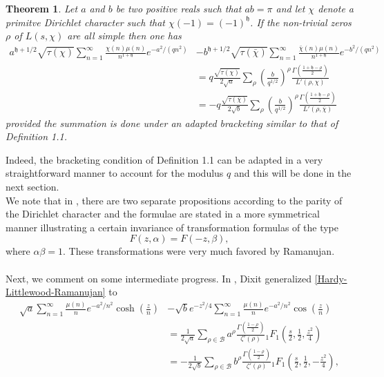 \documentclass[11pt]{article}
\newtheorem{theorem}{Theorem}[section]
\numberwithin{equation}{section}		 			%
\numberwithin{figure}{section}			 			%
\begin{document}
\begin{theorem} \label{dixit}
Let $a$ and $b$ be two positive reals such that $ab = \pi$ and let $\chi$ denote a primitve Dirichlet character such that $\chi(-1)=(-1)^\mathfrak{h}$. If the non-trivial zeros $\rho$ of $L(s,\chi)$ are all simple then one has
\begin{align} \label{dixit_eq_char}
  a^{\mathfrak{h} + 1/2} \sqrt {\tau(\chi )} \sum\limits_{n = 1}^\infty  {\frac{{\chi (n)\mu (n)}}
{{n^{1 + \mathfrak{h}} }}e^{ - a^2 /(qn^2 )} } & - b^{\mathfrak{h} + 1/2} \sqrt {\tau(\bar \chi )} \sum\limits_{n = 1}^\infty  {\frac{{\bar \chi (n)\mu (n)}}
{{n^{1 + \mathfrak{h}} }}e^{ - b^2 /(qn^2 )} }  \nonumber \\
  & = q\frac{{\sqrt {\tau(\chi )} }}
{{2\sqrt a }}\sum\limits_\rho  {\left( {\frac{b}
{{q^{1/2} }}} \right)^\rho  \frac{{\Gamma (\tfrac{{1 + \mathfrak{h} - \rho }}
{2})}}
{{L'(\rho ,\chi )}}} \nonumber \\
&=  - q\frac{{\sqrt {\tau(\bar \chi )} }}
{{2\sqrt b }}\sum\limits_\rho  {\left( {\frac{b}
{{q^{1/2} }}} \right)^\rho  \frac{{\Gamma (\tfrac{{1 + \mathfrak{h} - \rho }}
{2})}}
{{L'(\rho ,\bar \chi )}}}  
\end{align}
provided the summation is done under an adapted bracketing similar to that of \emph{Definition 1.1}. 
\end{theorem}
\noindent Indeed, the bracketing condition of Definition 1.1 can be adapted in a very straightforward manner to account for the modulus $q$ and this will be done in the next section.\\
We note that in \cite{dixit_1}, there are two separate propositions according to the parity of the Dirichlet character and the formulae are stated in a more symmetrical manner illustrating a certain invariance of transformation formulas of the type
\[F(z,\alpha ) = F( - z,\beta ),\]
where $\alpha \beta =1$. These transformations were very much favored by Ramanujan.\\\\
Next, we comment on some intermediate progress. In \cite{dixit_2}, Dixit generalized \eqref{Hardy-Littlewood-Ramanujan} to
\begin{align} \label{dixitcoscosh}
  \sqrt a \sum\limits_{n = 1}^\infty  {\frac{{\mu (n)}}{n}{e^{ - {a^2}/{n^2}}}\cosh \left( {\frac{z}{n}} \right)} &- \sqrt b {e^{ - {z^2}/4}}\sum\limits_{n = 1}^\infty  {\frac{{\mu (n)}}{n}{e^{ - {a^2}/{n^2}}}\cos \left( {\frac{z}{n}} \right)}  \nonumber \\
   &= \frac{1}{{2\sqrt a }}\sum\limits_{\rho  \in \mathcal{B}} {{a^\rho }{{\frac{{\Gamma (\tfrac{{1 - \rho }}{2})}}{{\zeta '(\rho )}}}}{_1F_1}\left( {\frac{s}{2},\frac{1}{2},\frac{{{z^2}}}{4}} \right)}  \nonumber \\
   &=  - \frac{1}{{2\sqrt b }}\sum\limits_{\rho  \in \mathcal{B}} {{b^\rho }{{\frac{{\Gamma (\tfrac{{1 - \rho }}{2})}}{{\zeta '(\rho )}}}}{_1F_1}\left( {\frac{s}{2},\frac{1}{2}, - \frac{{{z^2}}}{4}} \right)},   
\end{align}
\end{document}
